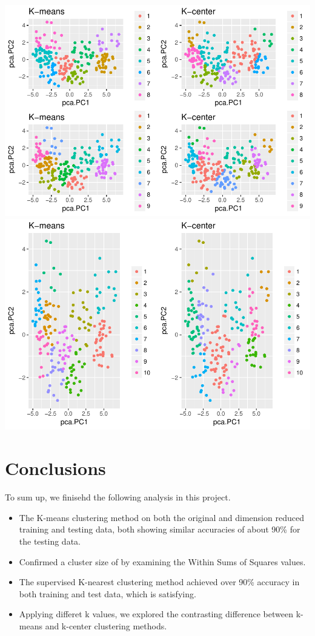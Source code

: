\documentclass[]{article}
\begin{document}
\includegraphics{Project2_files/figure-latex/unnamed-chunk-6-4.pdf}
\includegraphics{Project2_files/figure-latex/unnamed-chunk-6-5.pdf}

\section{Conclusions}\label{conclusions}

To sum up, we finisehd the following analysis in this project.

\begin{itemize}
\item
  The K-means clustering method on both the original and dimension
  reduced training and testing data, both showing similar accuracies of
  about 90\% for the testing data.
\item
  Confirmed a cluster size of by examining the Within Sums of Squares
  values.
\item
  The supervised K-nearest clustering method achieved over 90\% accuracy
  in both training and test data, which is satisfying.
\item
  Applying differet k values, we explored the contrasting difference
  between k-means and k-center clustering methods.
\end{itemize}
\end{document}
